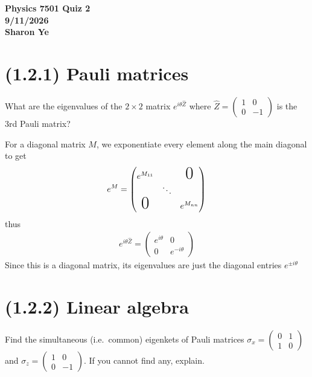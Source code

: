 \documentclass[11pt, answers]{exam}
\begin{document}
	\begin{center}
		\Large \bf Physics 7501 Quiz 2 \\ 9/11/2026 \\ Sharon Ye
	\end{center}
	
	\section*{(1.2.1) Pauli matrices}
	
	What are the eigenvalues of the $2\times 2$ matrix
	$e^{i\theta\hat{Z}}$ where
	$\hat{Z}=\begin{pmatrix}1 & 0 \\ 0 & -1\end{pmatrix}$
	is the 3rd Pauli matrix?
	
	\begin{solution}
		For a diagonal matrix $M$, we exponentiate every element along the main diagonal to get 
		\begin{align*}
			e^M =
			\begin{pmatrix}
				e^{M_{11}} &  & {\text{\huge0}} \\
				\ & \ddots & \ \\
				\text{\huge0} & \ & e^{M_{nn}}
			\end{pmatrix}
		\end{align*}
		thus
		\begin{align*}
			e^{i\theta\hat{Z}} = 
			\begin{pmatrix}
				e^{i\theta} & 0 \\
				0 & e^{-i\theta}
			\end{pmatrix}
		\end{align*}
		Since this is a diagonal matrix, its eigenvalues are just the diagonal entries $e^{\pm i\theta}$
	\end{solution}
	
	\section*{(1.2.2) Linear algebra}
	
	Find the simultaneous (i.e.\ common) eigenkets of Pauli matrices
	$\sigma_x=\begin{pmatrix}0 & 1 \\ 1 & 0\end{pmatrix}$ and
	$\sigma_z=\begin{pmatrix}1 & 0 \\ 0 & -1\end{pmatrix}$.
	If you cannot find any, explain.
	
\end{document}
